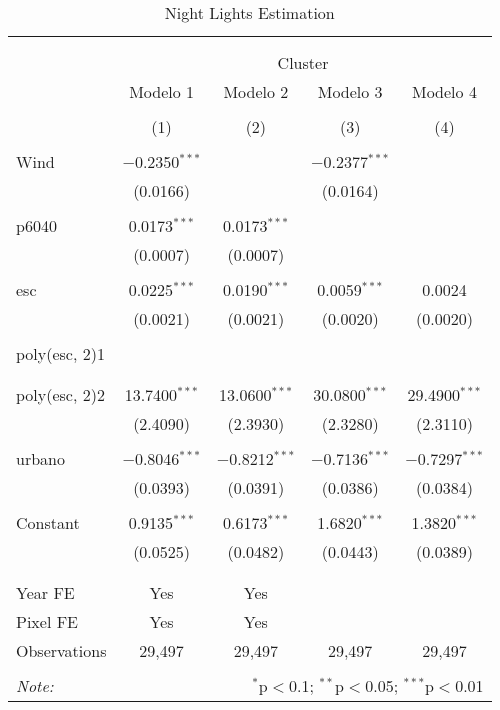 
\begin{table}[!htbp] \centering 
  \caption{Night Lights Estimation} 
  \label{} 
\begin{tabular}{@{\extracolsep{5pt}}lcccc} 
\\[-1.8ex]\hline 
\hline \\[-1.8ex] 
\\[-1.8ex] & \multicolumn{4}{c}{Cluster} \\ 
 & Modelo 1 & Modelo 2 & Modelo 3 & Modelo 4 \\ 
\\[-1.8ex] & (1) & (2) & (3) & (4)\\ 
\hline \\[-1.8ex] 
 Wind & $-$0.2350$^{***}$ &  & $-$0.2377$^{***}$ &  \\ 
  & (0.0166) &  & (0.0164) &  \\ 
  & & & & \\ 
 p6040 & 0.0173$^{***}$ & 0.0173$^{***}$ &  &  \\ 
  & (0.0007) & (0.0007) &  &  \\ 
  & & & & \\ 
 esc & 0.0225$^{***}$ & 0.0190$^{***}$ & 0.0059$^{***}$ & 0.0024 \\ 
  & (0.0021) & (0.0021) & (0.0020) & (0.0020) \\ 
  & & & & \\ 
 poly(esc, 2)1 &  &  &  &  \\ 
  &  &  &  &  \\ 
  & & & & \\ 
 poly(esc, 2)2 & 13.7400$^{***}$ & 13.0600$^{***}$ & 30.0800$^{***}$ & 29.4900$^{***}$ \\ 
  & (2.4090) & (2.3930) & (2.3280) & (2.3110) \\ 
  & & & & \\ 
 urbano & $-$0.8046$^{***}$ & $-$0.8212$^{***}$ & $-$0.7136$^{***}$ & $-$0.7297$^{***}$ \\ 
  & (0.0393) & (0.0391) & (0.0386) & (0.0384) \\ 
  & & & & \\ 
 Constant & 0.9135$^{***}$ & 0.6173$^{***}$ & 1.6820$^{***}$ & 1.3820$^{***}$ \\ 
  & (0.0525) & (0.0482) & (0.0443) & (0.0389) \\ 
  & & & & \\ 
\hline \\[-1.8ex] 
Year FE & Yes & Yes &  &  \\ 
Pixel FE & Yes & Yes &  &  \\ 
Observations & 29,497 & 29,497 & 29,497 & 29,497 \\ 
\hline 
\hline \\[-1.8ex] 
\textit{Note:}  & \multicolumn{4}{r}{$^{*}$p$<$0.1; $^{**}$p$<$0.05; $^{***}$p$<$0.01} \\ 
\end{tabular} 
\end{table} 
